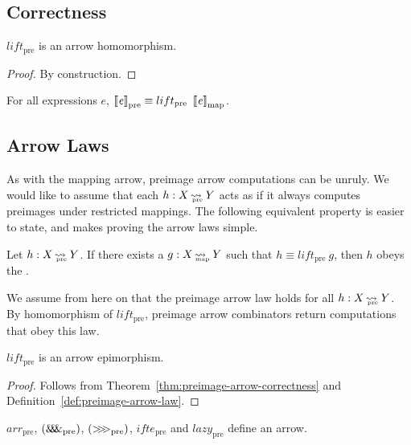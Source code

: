 \documentclass[preprint]{sigplanconf}
\newcommand{\arrow}{\rightsquigarrow}
\newcommand{\arrowlift}{\ensuremath{lift}}
\newcommand{\arrowarr}{\ensuremath{arr}}
\newcommand{\arrowcomp}{\ensuremath{{>}\mspace{-6mu}{>}\mspace{-6mu}{>}}}
\newcommand{\arrowpair}{\ensuremath{\mathit{\&\mspace{-7.5mu}\&\mspace{-7.5mu}\&}}}
\newcommand{\arrowif}{\ensuremath{ifte}}
\newcommand{\arrowlazy}{\ensuremath{lazy}}
\newcommand{\map}{_\mathrm{map}}
\DeclareMathOperator{\mapto}{\arrow_{\mspace{-21mu}\map}}
\newcommand{\pre}{_\mathrm{pre}}
\DeclareMathOperator{\preto}{\arrow_{\mspace{-19mu}\pre}}
\newcommand{\liftpre}{\arrowlift\pre}
\newcommand{\arrpre}{\arrowarr\pre}
\newcommand{\comppre}{\arrowcomp\pre}
\newcommand{\pairpre}{\arrowpair\pre}
\newcommand{\ifpre}{\arrowif\pre}
\newcommand{\lazypre}{\arrowlazy\pre}
\begin{document}
\subsection{Correctness}

\begin{theorem}
$\liftpre$ is an arrow homomorphism.
\label{thm:preimage-arrow-correctness}
\end{theorem}
\begin{proof}
By construction.
\end{proof}

\begin{corollary}
For all expressions $\mathit{e}$, $\meaningof{\mathit{e}}\pre \equiv \liftpre~\meaningof{\mathit{e}}\map$.
\label{cor:preimage-arrow-correctness}
\end{corollary}

\subsection{Arrow Laws}

As with the mapping arrow, preimage arrow computations can be unruly.
We would like to assume that each $h : X \preto Y$ acts as if it always computes preimages under restricted mappings.
The following equivalent property is easier to state, and makes proving the arrow laws simple.

\begin{definition}
Let $h : X \preto Y$. If there exists a $g : X \mapto Y$ such that $h \equiv \liftpre~g$, then $h$ obeys the .
\label{def:preimage-arrow-law}
\end{definition}

We assume from here on that the preimage arrow law holds for all $h : X \preto Y$.
By homomorphism of $\liftpre$, preimage arrow combinators return computations that obey this law.

\begin{theorem}
$\liftpre$ is an arrow epimorphism.
\end{theorem}
\begin{proof}
Follows from Theorem~\ref{thm:preimage-arrow-correctness} and Definition~\ref{def:preimage-arrow-law}.
\end{proof}

\begin{corollary}
$\arrpre$, $(\pairpre)$, $(\comppre)$, $\ifpre$ and $\lazypre$ define an arrow.
\end{corollary}
\end{document}
